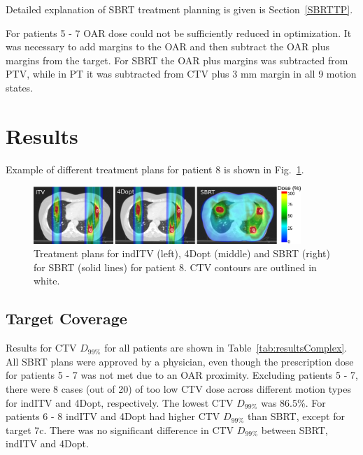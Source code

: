 \documentclass[type=dr, dr=rernat, accentcolor=tud7b,colorbacktitle, bigchapter, openright, twoside, 12pt ]{tudthesis}
\begin{document}
Detailed explanation of SBRT treatment planning is given is Section~\ref{SBRTTP}.

For patients 5 - 7 OAR dose could not be sufficiently reduced in optimization. It was necessary to add margins to the OAR and then 
subtract the OAR plus margins from the target. For SBRT the OAR plus margins was subtracted from PTV, while in PT it was subtracted from CTV plus 3 mm margin in all 9 motion states.

\section{Results}

Example of different treatment plans for patient 8 is shown in Fig.~\ref{Fig:multiExample}.

\begin{figure}[H]
	\begin{center}
		\includegraphics[width=0.9\textwidth]{./Images/multiExample.png}
		\caption{Treatment plans for indITV (left), 4Dopt (middle) and SBRT (right) for SBRT (solid lines) for patient 8. CTV contours are outlined in white.}
		\label{Fig:multiExample}
	\end{center}
\end{figure}

\subsection{Target Coverage}

Results for CTV $D_{99\%}$ for all patients are shown in Table~\ref{tab:resultsComplex}. All SBRT plans were approved by a physician, 
even though the prescription dose for patients 5 - 7 was not met due to an OAR proximity. Excluding patients 5 - 7, there were 8 cases (out of 20) of too low CTV dose across different
motion types for indITV and 4Dopt, respectively. The lowest CTV $D_{99\%}$ was 86.5\%.
For patients 6 - 8 indITV and 4Dopt had higher CTV $D_{99\%}$ than SBRT, except for target 7c.
There was no significant difference in CTV $D_{99\%}$ between SBRT, indITV and 4Dopt.
\end{document}
